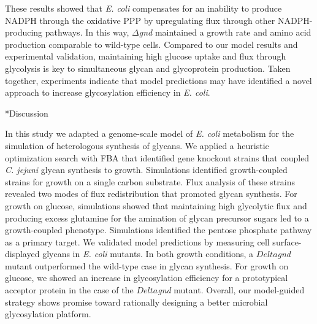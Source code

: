 \documentclass[12pt]{article}
\makeatletter
\renewcommand\section{\@startsection
	{subsection}{2}{0mm}
	{-0.2in}
	{0.05\baselineskip}
	{\normalfont\large\bfseries}}
\makeatother
\begin{document}
These results showed that \textit{E. coli} compensates for an inability to produce NADPH through the oxidative PPP by upregulating flux through other NADPH-producing pathways. 
In this way, $\Delta$\textit{gnd} maintained a growth rate and amino acid production comparable to wild-type cells. 
Compared to our model results and experimental validation, maintaining high glucose uptake and flux through glycolysis is key to simultaneous glycan and glycoprotein production. 
Taken together, experiments indicate that model predictions may have identified a novel approach to increase glycosylation efficiency in \textit{E. coli}. 

\newpage

\section*{Discussion}

In this study we adapted a genome-scale model of \textit{E. coli} metabolism for the simulation of heterologous synthesis of glycans. 
We applied a heuristic optimization search with FBA that identified gene knockout strains that coupled \textit{C. jejuni} glycan synthesis to growth. 
Simulations identified growth-coupled strains for growth on a single carbon substrate. 
Flux analysis of these strains revealed two modes of flux redistribution that promoted glycan synthesis. 
For growth on glucose, simulations showed that maintaining high glycolytic flux and producing excess glutamine for the amination of glycan precursor sugars led to a growth-coupled phenotype.  
Simulations identified the pentose phosphate pathway as a primary target. 
We validated model predictions by measuring cell surface-displayed glycans in \textit{E. coli} mutants. 
In both growth conditions, a $Delta$\textit{gnd} mutant outperformed the wild-type case in glycan synthesis. 
For growth on glucose, we showed an increase in glycosylation efficiency for a prototypical acceptor protein in the case of the $Delta$\textit{gnd} mutant. 
Overall, our model-guided strategy shows promise toward rationally designing a better microbial glycosylation platform. 
\end{document}
